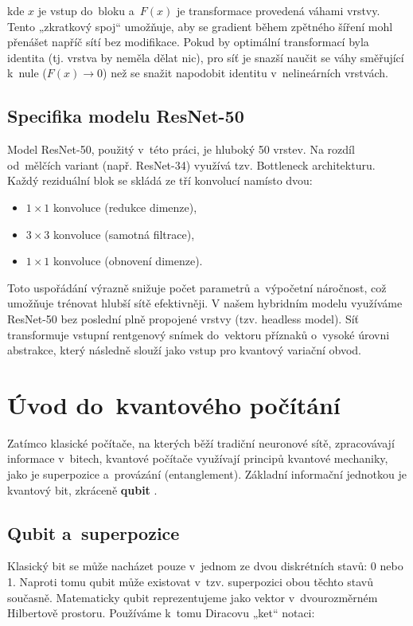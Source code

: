 \documentclass[12pt, a4paper]{report}
\begin{document}
kde $x$ je vstup do~bloku a~$F(x)$ je transformace provedená váhami vrstvy.
Tento „zkratkový spoj“ umožňuje, aby se gradient během zpětného šíření mohl přenášet napříč sítí bez modifikace.
Pokud by optimální transformací byla identita (tj. vrstva by neměla dělat nic), pro síť je snazší naučit se váhy směřující k~nule ($F(x) \to 0$) než se snažit napodobit identitu v~nelineárních vrstvách.

\subsection{Specifika modelu ResNet-50}
Model ResNet-50, použitý v~této práci, je hluboký 50 vrstev.
Na rozdíl od~mělčích variant (např. ResNet-34) využívá tzv. Bottleneck architekturu.
Každý reziduální blok se skládá ze tří konvolucí namísto dvou:
\begin{itemize}
    \item $1 \times 1$ konvoluce (redukce dimenze),
    \item $3 \times 3$ konvoluce (samotná filtrace),
    \item $1 \times 1$ konvoluce (obnovení dimenze).
\end{itemize}
Toto uspořádání výrazně snižuje počet parametrů a~výpočetní náročnost, což umožňuje trénovat hlubší sítě efektivněji.
V našem hybridním modelu využíváme ResNet-50 bez poslední plně propojené vrstvy (tzv. headless model).
Síť transformuje vstupní rentgenový snímek do~vektoru příznaků o~vysoké úrovni abstrakce, který následně slouží jako vstup pro kvantový variační obvod.

\section{Úvod do~kvantového počítání} \label{sec:kvantove_pocitani}

Zatímco klasické počítače, na kterých běží tradiční neuronové sítě, zpracovávají informace v~bitech, kvantové počítače využívají principů kvantové mechaniky, jako je superpozice a~provázání (entanglement).
Základní informační jednotkou je kvantový bit, zkráceně \textbf{qubit} \cite{nielsen_chuang}.

\subsection{Qubit a~superpozice}
Klasický bit se může nacházet pouze v~jednom ze dvou diskrétních stavů: 0 nebo 1. Naproti tomu qubit může existovat v~tzv.
superpozici obou těchto stavů současně. Matematicky qubit reprezentujeme jako vektor v~dvourozměrném Hilbertově prostoru.
Používáme k~tomu Diracovu „ket“ notaci:
\end{document}
